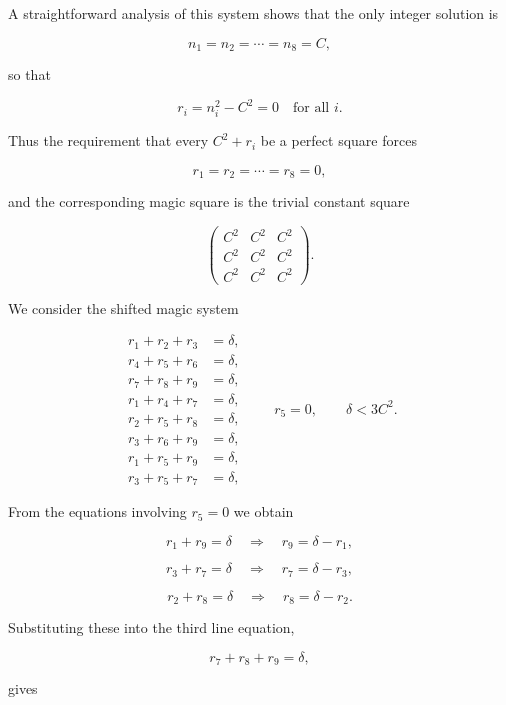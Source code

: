 \documentclass[12pt]{article}
\begin{document}
A straightforward analysis of this system shows that the only integer solution is


\[
n_{1}=n_{2}=\cdots=n_{8}=C,
\]


so that


\[
r_i = n_i^{2}-C^{2} = 0 \quad\text{for all } i.
\]



Thus the requirement that every $C^{2}+r_i$ be a perfect square forces


\[
r_{1}=r_{2}=\cdots=r_{8}=0,
\]


and the corresponding magic square is the trivial constant square


\[
\begin{pmatrix}
C^{2} & C^{2} & C^{2}\\
C^{2} & C^{2} & C^{2}\\
C^{2} & C^{2} & C^{2}
\end{pmatrix}.
\]


We consider the shifted magic system


\[
\begin{aligned}
r_{1}+r_{2}+r_{3} &= \delta,\\
r_{4}+r_{5}+r_{6} &= \delta,\\
r_{7}+r_{8}+r_{9} &= \delta,\\
r_{1}+r_{4}+r_{7} &= \delta,\\
r_{2}+r_{5}+r_{8} &= \delta,\\
r_{3}+r_{6}+r_{9} &= \delta,\\
r_{1}+r_{5}+r_{9} &= \delta,\\
r_{3}+r_{5}+r_{7} &= \delta,
\end{aligned}
\qquad r_{5}=0,\qquad \delta < 3C^{2}.
\]



From the equations involving \(r_{5}=0\) we obtain


\[
r_{1}+r_{9}=\delta \quad\Rightarrow\quad r_{9}=\delta-r_{1},
\]




\[
r_{3}+r_{7}=\delta \quad\Rightarrow\quad r_{7}=\delta-r_{3},
\]




\[
r_{2}+r_{8}=\delta \quad\Rightarrow\quad r_{8}=\delta-r_{2}.
\]



Substituting these into the third line equation,


\[
r_{7}+r_{8}+r_{9}=\delta,
\]


gives
\end{document}
